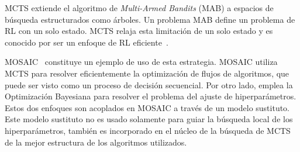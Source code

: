 MCTS extiende el algoritmo de \textit{Multi-Armed Bandits} (MAB) a espacios de búsqueda estructurados como árboles. Un problema MAB define un problema de RL con un solo estado. MCTS relaja esta limitación de un solo estado y es conocido por ser un enfoque de RL eficiente~\cite{rakotoarison2019automated}.

MOSAIC~\cite{rakotoarison2019automated} constituye un ejemplo de uso de esta estrategia. MOSAIC utiliza MCTS para resolver eficientemente la optimización de flujos de algoritmos, que puede ser visto como un proceso de decisión secuencial. Por otro lado, emplea la Optimización Bayesiana para resolver el problema del ajuste de hiperparámetros. Estos dos enfoques son acoplados en MOSAIC a través de un modelo sustituto. Este modelo sustituto no es usado solamente para guiar la búsqueda local de los hiperparámetros, también es incorporado en el núcleo de la búsqueda de MCTS de la mejor estructura de los algoritmos utilizados.

%

